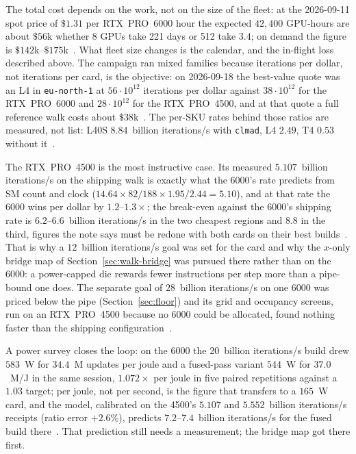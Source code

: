 The total cost depends on the work, not on the size of the fleet: at the
2026-09-11 spot price of $\$1.31$ per RTX~PRO~6000 hour the expected
$42{,}400$ GPU-hours are about $\$56$k whether 8 GPUs take 221 days or
512 take $3.4$; on demand the figure is $\$142$k--$\$175$k~.
What fleet size changes is the calendar, and the in-flight loss
described above. The campaign ran mixed families because iterations per
dollar, not iterations per card, is the objective: on 2026-09-18 the best-value quote was an L4 in \texttt{eu-north-1}
at $56\cdot10^{12}$ iterations per dollar against $38\cdot10^{12}$ for the
RTX~PRO~6000 and $28\cdot10^{12}$ for the RTX~PRO~4500, and at that
quote a full reference walk costs about
$\$38$k~. The per-SKU rates
behind those ratios are measured, not list: L40S $8.84$~billion iterations/s with
\texttt{clmad}, L4 $2.49$, T4 $0.53$ without it~.

The RTX~PRO~4500 is the most instructive case. Its measured $5.107$~billion iterations/s on
the shipping walk is exactly what the 6000's rate predicts from SM
count and clock ($14.64\times82/188\times1.95/2.44=5.10$), and at that rate the 6000 wins per dollar by $1.2$--$1.3\times$; the
break-even against the 6000's shipping rate is $6.2$--$6.6$~billion iterations/s in the
two cheapest regions and $8.8$ in the third, figures the note says
must be redone with both cards on their best
builds~. That
is why a $12$~billion iterations/s goal was set for the card and why the $x$-only
bridge map of Section~\ref{sec:walk-bridge} was pursued there rather
than on the 6000: a power-capped die rewards fewer instructions per
step more than a pipe-bound one does. The separate goal of $28$~billion iterations/s on
one 6000 was priced below the pipe (Section~\ref{sec:floor}) and its
grid and occupancy screens, run on an RTX~PRO~4500 because no 6000
could be allocated, found nothing faster than the shipping
configuration~.

A power survey closes the loop: on the 6000 the $20$~billion iterations/s build drew
$583$~W for $34.4$~M updates per joule and a fused-pass variant
$544$~W for $37.0$~M/J in the same session, $1.072\times$ per joule in
five paired repetitions against a $1.03$ target; per joule, not per
second, is the figure that transfers to a $165$~W card, and the model,
calibrated on the 4500's $5.107$ and $5.552$~billion iterations/s receipts (ratio error
$+2.6\%$), predicts $7.2$--$7.4$~billion iterations/s for the fused build
there~. That prediction still
needs a measurement; the bridge map got there first.

